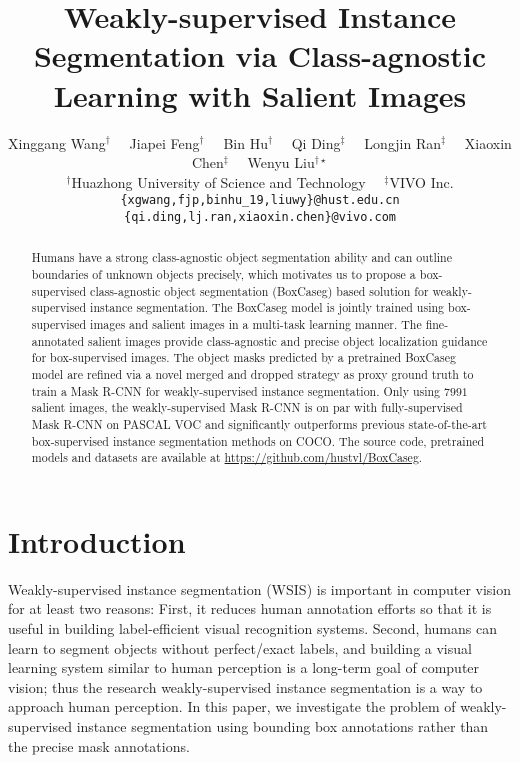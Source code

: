 \documentclass[final]{cvpr}
\title{Weakly-supervised Instance Segmentation via Class-agnostic Learning with Salient Images}
\begin{document}
\author{Xinggang Wang$^{\dag}$ \ \  Jiapei Feng$^{\dag}$ \ \  Bin Hu$^{\dag}$ \ \   Qi Ding$^{\ddag}$ \ \ Longjin Ran$^{\ddag}$ \ \ Xiaoxin Chen$^{\ddag}$ \ \  Wenyu Liu$^{\dag\star}$  \\
        $^{\dag}$Huazhong University of Science and Technology \ \   $^{\ddag}$VIVO Inc. \\    
        {\tt\small \{xgwang,fjp,binhu\_19,liuwy\}@hust.edu.cn \{qi.ding,lj.ran,xiaoxin.chen\}@vivo.com}
}


\maketitle


\begin{abstract}
    Humans have a strong class-agnostic object segmentation ability and can outline boundaries of unknown objects precisely, which motivates us to propose a box-supervised class-agnostic object segmentation (BoxCaseg) based solution for weakly-supervised instance segmentation. The BoxCaseg model is jointly trained using box-supervised images and salient images in a multi-task learning manner. The fine-annotated salient images provide class-agnostic and precise object localization guidance for box-supervised images. The object masks predicted by a pretrained BoxCaseg model are refined via a novel merged and dropped strategy as proxy ground truth to train a Mask R-CNN for weakly-supervised instance segmentation. Only using $7991$ salient images, the weakly-supervised Mask R-CNN is on par with fully-supervised Mask R-CNN on PASCAL VOC and significantly outperforms previous state-of-the-art box-supervised instance segmentation methods on COCO. The source code, pretrained models and datasets are available at \url{https://github.com/hustvl/BoxCaseg}.
\end{abstract}

\let\thefootnote\relax{}


\vspace{-3mm}
\section{Introduction}
Weakly-supervised instance segmentation (WSIS) is important in computer vision for at least two reasons: First, it reduces human annotation efforts so that it is useful in building label-efficient visual recognition systems. Second, humans can learn to segment objects without perfect/exact labels, and building a visual learning system similar to human perception is a long-term goal of computer vision; thus the research weakly-supervised instance segmentation is a way to approach human perception. In this paper, we investigate the problem of weakly-supervised instance segmentation using bounding box annotations rather than the precise mask annotations. 
\end{document}
